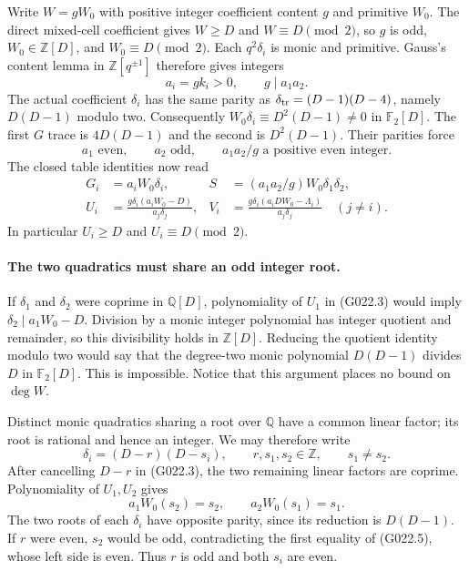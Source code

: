 Write $W=gW_0$ with positive integer coefficient content $g$
and primitive $W_0$. The direct mixed-cell coefficient gives
$W\ge D$ and $W\equiv D\pmod2$, so $g$ is odd,
$W_0\in\mathbb Z[D]$, and $W_0\equiv D\pmod2$.
Each $q^2\delta_i$ is monic and primitive. Gauss's content lemma
in $\mathbb Z[q^{\pm1}]$ therefore gives integers
\[
 a_i=gk_i>0,\qquad g\mid a_1a_2.
\]
The actual coefficient $\delta_i$ has the same parity as
$\delta_{\rm tr}=(D-1)(D-4)$, namely $D(D-1)$ modulo two.
Consequently $W_0\delta_i\equiv D^2(D-1)\ne0$ in
$\mathbb F_2[D]$. The first $G$ trace is $4D(D-1)$ and the
second is $D^2(D-1)$. Their parities force
\[
 a_1\text{ even},\qquad a_2\text{ odd},\qquad
 a_1a_2/g\text{ a positive even integer}.             \tag{G022.2}
\]
The closed table identities now read
\[
 \begin{aligned}
 G_i&=a_iW_0\delta_i,&
 S&=(a_1a_2/g)W_0\delta_1\delta_2,\\
 U_i&=\frac{g\delta_i(a_iW_0-D)}{a_j\delta_j},&
 V_i&=\frac{g\delta_i(a_iDW_0-\Lambda_i)}{a_j\delta_j}
       \quad(j\ne i).
 \end{aligned}                                        \tag{G022.3}
\]
In particular $U_i\ge D$ and $U_i\equiv D\pmod2$.

\paragraph{The two quadratics must share an odd integer root.}
If $\delta_1$ and $\delta_2$ were coprime in $\mathbb Q[D]$,
polynomiality of $U_1$ in (G022.3) would imply
$\delta_2\mid a_1W_0-D$. Division by a monic integer polynomial
has integer quotient and remainder, so this divisibility holds
in $\mathbb Z[D]$. Reducing the quotient identity modulo two
would say that the degree-two monic polynomial $D(D-1)$ divides
$D$ in $\mathbb F_2[D]$. This is impossible. Notice that this
argument places no bound on $\deg W$.

Distinct monic quadratics sharing a root over $\mathbb Q$ have
a common linear factor; its root is rational and hence an integer.
We may therefore write
\[
 \delta_i=(D-r)(D-s_i),\qquad r,s_1,s_2\in\mathbb Z,
 \qquad s_1\ne s_2.
 \tag{G022.4}
\]
After cancelling $D-r$ in (G022.3), the two remaining linear
factors are coprime. Polynomiality of $U_1,U_2$ gives
\[
 a_1W_0(s_2)=s_2,\qquad a_2W_0(s_1)=s_1.             \tag{G022.5}
\]
The two roots of each $\delta_i$ have opposite parity, since
its reduction is $D(D-1)$. If $r$ were even, $s_2$ would be odd,
contradicting the first equality of (G022.5), whose left side
is even. Thus $r$ is odd and both $s_i$ are even.

